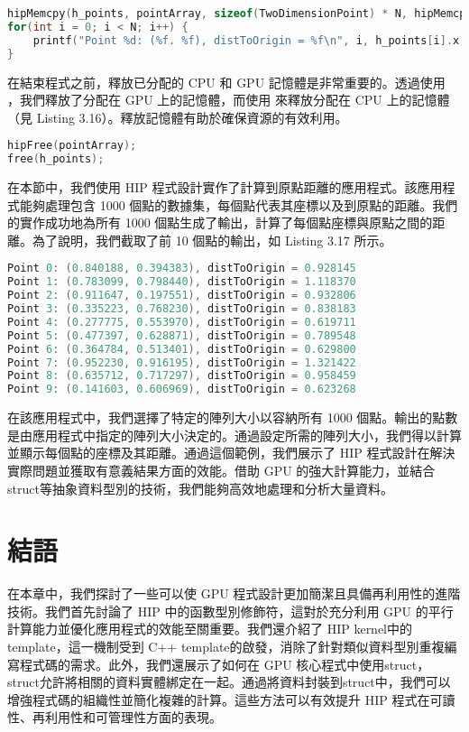 \begin{lstlisting}[language=C, caption={從GPU到CPU的記憶體複製}, label={15th:example}]
hipMemcpy(h_points, pointArray, sizeof(TwoDimensionPoint) * N, hipMemcpyDeviceToHost);
for(int i = 0; i < N; i++) {
    printf("Point %d: (%f. %f), distToOrigin = %f\n", i, h_points[i].x, h_points[i.y, h_points[i].distToOrigin]);
}
\end{lstlisting}

在結束程式之前，釋放已分配的 CPU 和 GPU 記憶體是非常重要的。透過使用 ，我們釋放了分配在 GPU 上的記憶體，而使用  來釋放分配在 CPU 上的記憶體（見 Listing 3.16）。釋放記憶體有助於確保資源的有效利用。

\begin{lstlisting}[language=C, caption={HIP中的記憶體釋放}, label={16th:example}]
hipFree(pointArray);
free(h_points);
\end{lstlisting}

在本節中，我們使用 HIP 程式設計實作了計算到原點距離的應用程式。該應用程式能夠處理包含 1000 個點的數據集，每個點代表其座標以及到原點的距離。我們的實作成功地為所有 1000 個點生成了輸出，計算了每個點座標與原點之間的距離。為了說明，我們截取了前 10 個點的輸出，如 Listing 3.17 所示。

\begin{lstlisting}[language=C, caption={"Distance to Origin program" HIP 範例的輸出}, label={17th:example}]
Point 0: (0.840188, 0.394383), distToOrigin = 0.928145
Point 1: (0.783099, 0.798440), distToOrigin = 1.118370
Point 2: (0.911647, 0.197551), distToOrigin = 0.932806
Point 3: (0.335223, 0.768230), distToOrigin = 0.838183
Point 4: (0.277775, 0.553970), distToOrigin = 0.619711
Point 5: (0.477397, 0.628871), distToOrigin = 0.789548
Point 6: (0.364784, 0.513401), distToOrigin = 0.629800
Point 7: (0.952230, 0.916195), distToOrigin = 1.321422
Point 8: (0.635712, 0.717297), distToOrigin = 0.958459
Point 9: (0.141603, 0.606969), distToOrigin = 0.623268
\end{lstlisting}

在該應用程式中，我們選擇了特定的陣列大小以容納所有 1000 個點。輸出的點數是由應用程式中指定的陣列大小決定的。通過設定所需的陣列大小，我們得以計算並顯示每個點的座標及其距離。通過這個範例，我們展示了 HIP 程式設計在解決實際問題並獲取有意義結果方面的效能。借助 GPU 的強大計算能力，並結合struct等抽象資料型別的技術，我們能夠高效地處理和分析大量資料。

\section{結語}

在本章中，我們探討了一些可以使 GPU 程式設計更加簡潔且具備再利用性的進階技術。我們首先討論了 HIP 中的函數型別修飾符，這對於充分利用 GPU 的平行計算能力並優化應用程式的效能至關重要。我們還介紹了 HIP kernel中的template，這一機制受到 C++ template的啟發，消除了針對類似資料型別重複編寫程式碼的需求。此外，我們還展示了如何在 GPU 核心程式中使用struct，struct允許將相關的資料實體綁定在一起。通過將資料封裝到struct中，我們可以增強程式碼的組織性並簡化複雜的計算。這些方法可以有效提升 HIP 程式在可讀性、再利用性和可管理性方面的表現。
